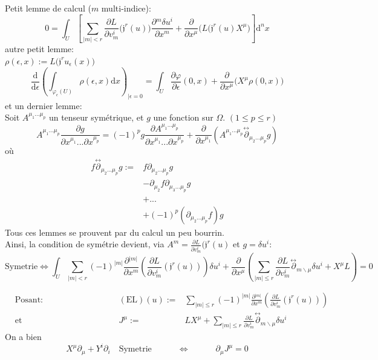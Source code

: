 \documentclass[a4paper,11pt]{article}
\renewcommand{\d}{{\mathrm{d}}}
\newcommand{\dr}[2]{\frac{\partial {#1}}{\partial{#2}}}
\begin{document}
Petit lemme de calcul ($m$ multi-indice):
$$0 = \int_U \left[\sum_{|m|<r}\dr L{v^i_m}\big(\mathfrak{j}^r(u)\big)\dr{^m\delta u^i}{x^m}+\dr{}{x^\mu}\big(L(\mathfrak{j}^r(u)X^\mu\big) \right] \d^n x$$
autre petit lemme:\\
$\rho(\epsilon,x):=L\big(\mathfrak{j}^ru_\epsilon(x)\big)$
$$\frac{\d}{\d \epsilon}\left( \int_{\varphi_\epsilon(U)}\rho(\epsilon,x) \d  x \right) _{\Big|\epsilon=0} = \int_U \dr\varphi\epsilon(0,x)+\dr{}{x^\mu}\big(X^\mu\rho(0,x)\big)$$
et un dernier lemme:\\
Soit $A^{\mu_1 ... \mu_p}$ un tenseur symétrique, et $g$ une fonction sur $\Omega$. $(1\leq p\leq r)$
$$A^{\mu_1...\mu_p} \dr g{x^{\mu_1}...\partial x^{\mu_p}} = (-1)^p g \dr{A^{\mu_1...\mu_p}}{x^{\mu_1}...\partial x^{\mu_p}} + \dr{}{x^{\mu_1}}\left(A^{\mu_1...\mu_p}\overset{\leftrightarrow}\partial_{\mu_2...\mu_p}g\right)$$
où
\begin{align*}
f\overset{\leftrightarrow}\partial_{\mu_2...\mu_p} g:=
& f \partial_{\mu_2...\mu_p} g\\
&- \partial_{\mu_2} f \partial_{\mu_3...\mu_p} g\\
&+ ...\\
&+ (-1)^p (\partial_{\mu_2...\mu_p} f) g
\end{align*}
Tous ces lemmes se prouvent par du calcul un peu bourrin.\\
Ainsi, la condition de symétrie devient, via $A^m=\dr L{v^i_m}(\mathfrak{j}^r(u)$ et $g=\delta u^i$:
$$\mathrm{Symetrie} \iff \int_U \sum_{|m|<r} (-1)^{|m|} \dr{^{|m|}}{x^m}\left(\dr L{v^i_m}(\mathfrak{j}^r(u))\right)\delta u^i + \dr{}{x^\mu} \left(\sum_{|m|\leq r} \dr L{v^i_m}\overset{\leftrightarrow}\partial_{m\backslash\mu} \delta u^i + X^\mu L\right) = 0$$

\begin{align*}
&\mathrm{Posant}:\quad\quad\quad\quad\quad\quad\quad\quad&(\mathrm{EL})(u):=& \sum_{|m|\leq r} (-1)^{|m|} \dr{^{|m|}}{x^m}\left(\dr L{v^i_m}(\mathfrak{j}^r(u))\right)
\quad\quad\quad\quad\quad\quad\quad\quad\quad\quad\\
&\mathrm{et}&
J^\mu :=& LX^\mu + \sum_{|m|\leq r} \dr L{v^i_m} \overset{\leftrightarrow}\partial_{m\backslash\mu} \delta u^i
\end{align*}
On a bien
$$X^\mu \partial_\mu + Y^i \partial_i\quad\mathrm{Symetrie} \quad \quad \quad \iff\quad \quad \quad 
 \partial_\mu J^\mu = 0$$
\end{document}

